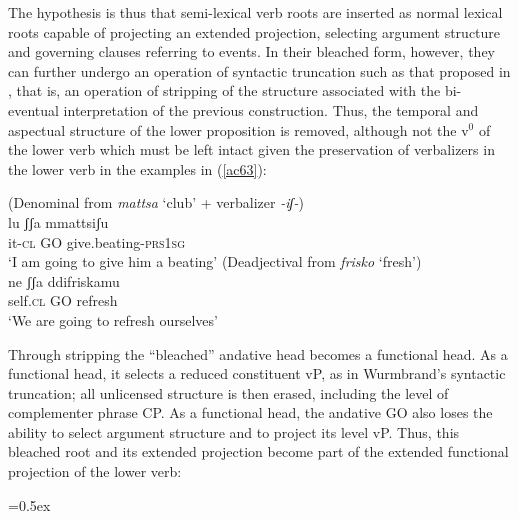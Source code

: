 \documentclass[output=paper]{langscibook}
\begin{document}
The hypothesis is thus that semi-lexical verb roots are inserted as normal lexical roots capable of projecting an extended projection, selecting argument structure and governing clauses referring to events.  In their bleached form, however, they can further undergo an operation of syntactic truncation such as that proposed in \citet{wurmbrand2014a, wurmbrand2015, wurmbrand2017verb}, that is, an operation of stripping of the structure associated with the bi-eventual interpretation of the previous construction. Thus, the temporal and aspectual structure of the lower proposition is removed, although not the v$^0$ of the lower verb which must be left intact given the preservation of verbalizers in the lower verb in the examples in (\ref{ac63}):

\ea \label{ac63}
\ea (Denominal from \textit{mattsa} ‘club’ + verbalizer \textit{-iʃ-})\label{ac63a}\\
\gll lu     ʃʃa  mmattsiʃu\\
     it-\textsc{cl} GO  give.beating-\textsc{prs}\textsc{1sg}\\
 \glt ‘I am going to give him a beating’
\ex (Deadjectival from \textit{frisko} ‘fresh’)\\
\label{ac63b}\gll ne    ʃʃa   ddifriskamu\\
 self.\textsc{cl}  GO  refresh\\
 \glt ‘We are going to refresh ourselves’
    \z
\z

Through stripping the ``bleached'' andative head becomes a functional head. As a functional head, it selects a reduced constituent vP, as in Wurmbrand's syntactic truncation; all unlicensed structure is then erased, including the level of complementer  phrase CP. As a functional head, the andative GO also loses the ability to select argument structure and to project its level vP. Thus, this bleached root and its extended projection become part of the extended functional projection of the lower verb:

\ea\tabcolsep=0.5ex
\z
\end{document}
